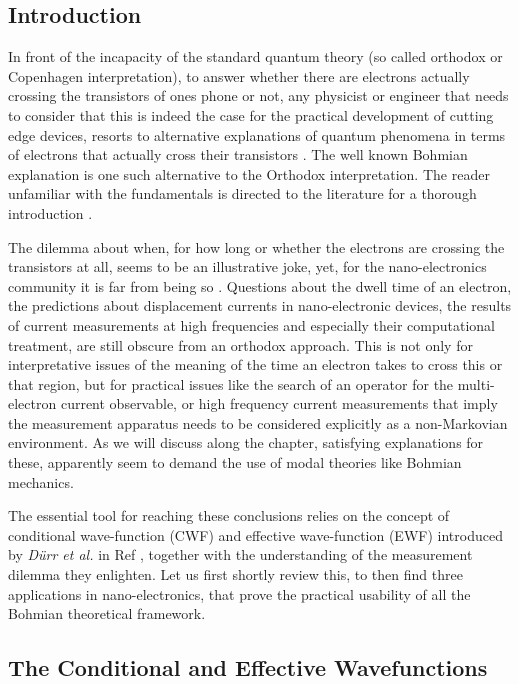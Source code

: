 \documentclass[11pt, a4paper]{article} %
\begin{document}
\newpage
{}
\setcounter{page}{1}

\subsection*{Introduction}
In front of the incapacity of the standard quantum theory (so called orthodox or Copenhagen interpretation), to answer whether there are electrons actually crossing the transistors of ones phone or not, any physicist or engineer that needs to consider that this is indeed the case for the practical development of cutting edge devices, resorts to alternative explanations of quantum phenomena in terms of electrons that actually cross their transistors \cite{where}. The well known Bohmian explanation is one such alternative to the Orthodox interpretation. The reader unfamiliar with the fundamentals is directed to the literature for a thorough introduction \cite{Durr} \cite{JordiXavier}.

The dilemma about when, for how long or whether the electrons are crossing the transistors at all, seems to be an illustrative joke, yet, for the nano-electronics community it is far from being so \cite{where}. Questions about the dwell time of an electron, the predictions about displacement currents in nano-electronic devices, the results of current measurements at high frequencies and especially their computational treatment, are still obscure from an orthodox approach. This is not only for interpretative issues of the meaning of the time an electron takes to cross this or that region, but for practical issues like the search of an operator for the multi-electron current observable, or high frequency current measurements that imply the measurement apparatus needs to be considered explicitly as a non-Markovian environment. As we will discuss along the chapter, satisfying explanations for these, apparently seem to demand the use of modal theories like Bohmian mechanics.

The essential tool for reaching these conclusions relies on the concept of conditional wave-function (CWF) and effective wave-function (EWF) introduced by {\em Dürr et al.} in Ref \cite{Absolute}, together with the understanding of the measurement dilemma they enlighten. Let us first shortly review this, to then find three applications in nano-electronics, that prove the practical usability of all the Bohmian theoretical framework.

\subsection*{The Conditional and Effective Wavefunctions}
\end{document}

